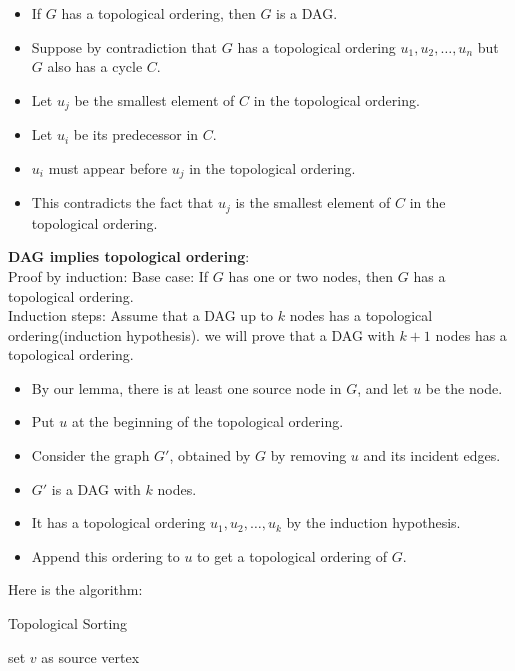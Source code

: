 \documentclass[onecolumn]{report}
\begin{document}
\begin{itemize}
    \item If $G$ has a topological ordering, then $G$ is a DAG.
    \item Suppose by contradiction that $G$ has a topological ordering $u_1,u_2,\dots,u_n$ but $G$ also has a cycle $C$.
    \item Let $u_j$ be the smallest element of $C$ in the topological ordering.
    \item Let $u_i$ be its predecessor in $C$.
    \item $u_i$ must appear before $u_j$ in the topological ordering.
    \item This contradicts the fact that $u_j$ is the smallest element of $C$ in the topological ordering.
\end{itemize}

\noindent
\textbf{DAG implies topological ordering}:\\
Proof by induction:
Base case: If $G$ has one or two nodes, then $G$ has a topological ordering.\\
Induction steps: Assume that a DAG up to $k$ nodes has a topological ordering(induction hypothesis). we will prove that a DAG with $k+1$ nodes has a topological ordering.
\begin{itemize}
    \item By our lemma, there is at least one source node in $G$, and let $u$ be the node.
    \item Put $u$ at the beginning of the topological ordering.
    \item Consider the graph $G'$, obtained by $G$ by removing $u$ and its incident edges.
    \item $G'$ is a DAG with $k$ nodes.
    \item It has a topological ordering $u_1,u_2,\dots,u_k$ by the induction hypothesis.
    \item Append this ordering to $u$ to get a topological ordering of $G$.
\end{itemize}
\noindent
Here is the algorithm:\\
\begin{algorithm}[H]
\caption{Topological Sorting}
\begin{algorithmic}[1]
\State set $v$ as source vertex

\EndProcedure
\end{algorithmic}
\end{algorithm}
\noindent
\end{document}
